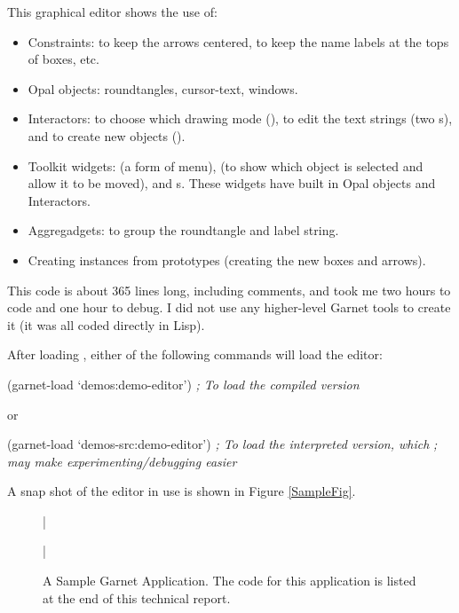 This graphical editor shows the use of:
\begin{itemize}
\item Constraints: to keep the arrows centered,
to keep the name labels at the tops of boxes, etc.

\item Opal objects: roundtangles, cursor-text, windows.

\item Interactors: to choose which drawing mode (), to edit
the text strings (two s), and to create new objects
().

\item Toolkit widgets:  (a form of menu),
 (to show
which object is selected and allow it to be moved), and s.
These widgets have built in Opal objects and Interactors.

\item Aggregadgets: to group the roundtangle and label string.

\item Creating instances from prototypes (creating the new boxes and arrows).
\end{itemize}

This code is about 365 lines long, including comments, and took me two
hours to code and one hour to debug.  I did not use any higher-level Garnet
tools to create it (it was all coded directly in Lisp).


After loading , either of the following commands
will load the editor:

\begin{programexample}
(garnet-load `demos:demo-editor')        {\it ; To load the compiled version}
\end{programexample}
or
\begin{programexample}
(garnet-load `demos-src:demo-editor')    {\it ; To load the interpreted version, which}
                                         {\it ; may make experimenting/debugging easier}
\end{programexample}




A snap shot of the editor in use is shown in Figure \ref{SampleFig}.
\begin{figure}
\bar{}
\begin{center}
\end{center}
\caption{A Sample Garnet Application.  The code for this application is
listed at the end of this technical report.}
\bar{}
\end{figure}

